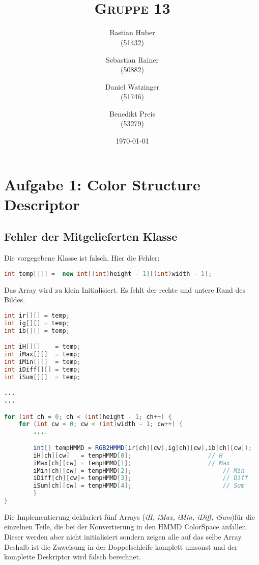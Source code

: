 \documentclass{article}
\author{Bastian Huber\\(51432) \and Sebastian Rainer\\(50882) \and Daniel Watzinger\\(51746) \and Benedikt Preis \\(53279)}
\title{\textbf{\huge{\thetitle}}\\\large\textsc{Gruppe 13}}
\date{\today}
\newcommand{\mysection}[1]{\section*{#1} \setcounter{subsection}{0}}
\begin{document}
\hyphenation{}

\maketitle

\pagestyle{fancy}


\mysection{Aufgabe 1: Color Structure Descriptor}
  \subsection{Fehler der Mitgelieferten Klasse}
    Die vorgegebene Klasse ist falsch. Hier die Fehler:
    \begin{lstlisting}[language=Java]
int temp[][] =  new int[(int)height - 1][(int)width - 1];
    \end{lstlisting}
    Das Array wird zu klein Initialisiert. Es fehlt der rechte und untere Rand des Bildes.
    
    
    \begin{lstlisting}[language=Java]
int ir[][] = temp;
int ig[][] = temp;
int ib[][] = temp;

int iH[][]    = temp;
int iMax[][]  = temp;
int iMin[][]  = temp;
int iDiff[][] = temp;
int iSum[][]  = temp;

...
...

for (int ch = 0; ch < (int)height - 1; ch++) {
	for (int cw = 0; cw < (int)width - 1; cw++) {
		....

		int[] tempHMMD = RGB2HMMD(ir[ch][cw],ig[ch][cw],ib[ch][cw]);
		iH[ch][cw]   = tempHMMD[0];						// H
		iMax[ch][cw] = tempHMMD[1];						// Max
		iMin[ch][cw] = tempHMMD[2]; 						// Min
		iDiff[ch][cw]= tempHMMD[3]; 						// Diff
		iSum[ch][cw] = tempHMMD[4]; 						// Sum
		}
}
    \end{lstlisting}
    Die Implementierung deklariert fünf Arrays (\emph{iH, iMax, iMin, iDiff, iSum})für die einzelnen Teile, die bei der Konvertierung in den
    HMMD ColorSpace anfallen. Dieser werden aber nicht initialisiert sondern zeigen alle auf das selbe Array. Deshalb ist die Zuweisung in der Doppelschleife komplett umsonst und der komplette Deskriptor wird falsch berechnet.
    
\end{document}
